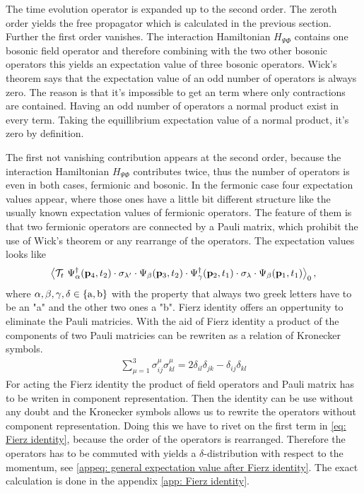 The time evolution operator is expanded up to the second order.
The zeroth order yields the free propagator which is calculated in the previous section.
Further the first order vanishes.
The interaction Hamiltonian $H_{\Psi\Phi}$ contains one bosonic field operator and therefore combining with the two other bosonic operators this yields an expectation value of three bosonic operators.
Wick's theorem says that the expectation value of an odd number of operators is always zero.
The reason is that it's impossible to get an term where only contractions are contained.
Having an odd number of operators a normal product exist in every term.
Taking the equillibrium expectation value of a normal product, it's zero by definition.

The first not vanishing contribution appears at the second order, because the interaction Hamiltonian $H_{\Psi\Phi}$ contributes twice, thus the number of operators is even in both cases, fermionic and bosonic.
In the fermonic case four expectation values appear, where those ones have a little bit different structure like the usually known expectation values of fermionic operators.
The feature of them is that two fermionic operators are connected by a Pauli matrix, which prohibit the use of Wick's theorem or any rearrange of the operators.
The expectation values looks like
%
\begin{align}
	\expval{\mathcal{T}_{t}\ \Psi_{\alpha}^{\dag}(\vb{p}_{4},t_{2}) \cdot \sigma_{\lambda'} \cdot \Psi_{\beta}(\vb{p}_{3},t_{2}) \cdot \Psi_{\gamma}^{\dag}(\vb{p}_{2},t_{1}) \cdot \sigma_{\lambda} \cdot \Psi_{\beta}(\vb{p}_{1},t_{1})}_{0},
	\label{eq: structure of fermionic expval}
\end{align}
%
where $\alpha,\beta,\gamma,\delta \in \{\mathrm{a},\mathrm{b}\}$ with the property that always two greek letters have to be an "a" and the other two ones a "b".
Fierz identity offers an oppertunity to eliminate the Pauli matricies.
With the aid of Fierz identity a product of the components of two Pauli matricies can be rewriten as a relation of Kronecker symbols.
%
\begin{align}
	\sum\limits_{\mu = 1}^{3} \sigma_{ij}^{\mu} \sigma_{kl}^{\mu} = 2 \delta_{il} \delta_{jk} - \delta_{ij} \delta_{kl}
	\label{eq: Fierz identity}
\end{align}
%
For acting the Fierz identity the product of field operators and Pauli matrix has to be writen in component representation.
Then the identity can be use without any doubt and the Kronecker symbols allows us to rewrite the operators without component representation.
Doing this we have to rivet on the first term in \eqref{eq: Fierz identity}, because the order of the operators is rearranged.
Therefore the operators has to be commuted  with yields a $\delta$-distribution with respect to the momentum, see \eqref{appeq: general expectation value after Fierz identity}.
The exact calculation is done in the appendix \ref{app: Fierz identity}.

